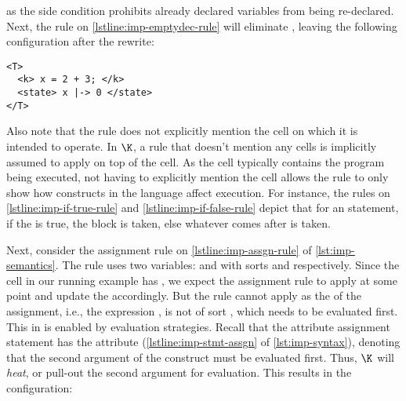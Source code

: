 as the side condition prohibits already declared variables from being
re-declared.
Next, the rule on \autoref{lstline:imp-emptydec-rule} will eliminate
, leaving the following configuration after the rewrite:
\begin{lstlisting}[language=k,style=ksty]
<T>
  <k> x = 2 + 3; </k>
  <state> x |-> 0 </state>
</T>
\end{lstlisting}
Also note that the rule does not explicitly mention the cell on which
it is intended to operate. In $\K$, a rule that doesn't
mention any cells is implicitly assumed to apply on top of the
 cell. As the  cell typically
contains the program being executed, not having to explicitly
mention the cell allows the rule to only show how constructs in the language
affect execution. For instance, the rules on \autoref{lstline:imp-if-true-rule}
and \autoref{lstline:imp-if-false-rule} depict that for an
 statement,
if the  is true, the  block is taken,
else whatever comes after is taken.

Next, consider the assignment rule on \autoref{lstline:imp-assgn-rule} of
\autoref{lst:imp-semantics}. The rule uses two variables:  and 
with sorts  and  respectively. Since the 
cell in our running example has , we expect the assignment
rule to apply at some point and update the  accordingly.
But the rule cannot apply as the \RHS{} of the assignment, i.e., the expression
, is not of sort , which needs to be evaluated
first. This in \K{} is enabled by evaluation strategies.
Recall that the attribute assignment statement has the attribute
 (\autoref{lstline:imp-stmt-assgn} of
\autoref{lst:imp-syntax}), denoting that the second argument of the
construct must be evaluated first. Thus,
$\K$ will \emph{heat}, or pull-out the second
argument for evaluation. This results in the configuration:

\newpage

